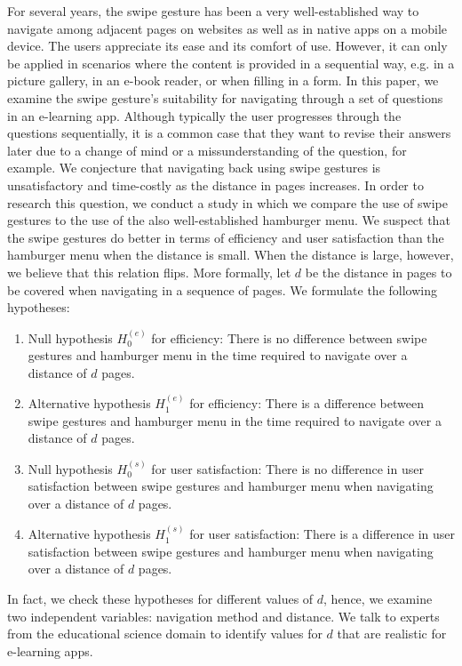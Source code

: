 \documentclass{sig-alternate-05-2015}
\begin{document}
For several years, the swipe gesture has been a very well-established way to navigate among adjacent pages on websites as well as in native
apps on a mobile device. The users appreciate its ease and its comfort of use. However, it can only be applied in scenarios where
the content is provided in a sequential way, e.g. in a picture gallery, in an e-book reader, or when filling in a form. In this paper, we
examine the swipe gesture's suitability for navigating through a set of questions in an e-learning app. Although typically the user progresses
through the questions sequentially, it is a common case that they want to revise their answers later due to a change of mind or a missunderstanding
of the question, for example. We conjecture that navigating back using swipe gestures is unsatisfactory and time-costly as the distance in pages
increases. In order to research this question, we conduct a study in which we compare the use of swipe gestures to the use of the also
well-established hamburger menu. We suspect that the swipe gestures do better in terms of efficiency and
user satisfaction than the hamburger menu when the distance is small. When the distance is large, however,
we believe that this relation flips. More formally, let $d$ be the distance in pages to be covered when navigating in a sequence of pages.
We formulate the following hypotheses:
\begin{enumerate}
  \item Null hypothesis $H_0^{(e)}$ for efficiency: There is no difference between swipe gestures and hamburger menu in the time required to navigate over a distance of $d$ pages.
  \item Alternative hypothesis $H_1^{(e)}$ for efficiency: There is a difference between swipe gestures and hamburger menu in the time required to navigate over a distance of $d$ pages.
  \item Null hypothesis $H_0^{(s)}$ for user satisfaction: There is no difference in user satisfaction between swipe gestures and hamburger menu when navigating over a distance of $d$ pages.
  \item Alternative hypothesis $H_1^{(s)}$ for user satisfaction: There is a difference in user satisfaction between swipe gestures and hamburger menu when navigating over a distance of $d$ pages.
\end{enumerate}
In fact, we check these hypotheses for different values of $d$, hence, we examine two independent variables: navigation method and distance. We talk to experts from the educational science domain to identify values for $d$ that are realistic for e-learning apps.
\end{document}

